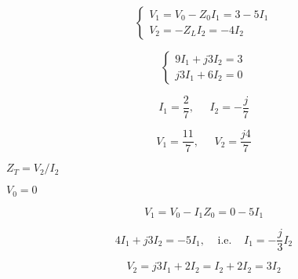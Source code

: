 {\newpage\clearpage
{}%
\begin{displaymath} \left\{ \begin{array}{l} V_1=V_0-Z_0 I_1=3-5I_1 \\
	V_2=-Z_L I_2=-4 I_2 \end{array} \right.	\end{displaymath}%
\lthtmldisplayZ
\lthtmlcheckvsize\clearpage}

{\newpage\clearpage
{}%
\begin{displaymath} \left\{ \begin{array}{l} 9I_1+j3I_2=3 \\j3I_1+6I_2=0 \end{array} \right. \end{displaymath}%
\lthtmldisplayZ
\lthtmlcheckvsize\clearpage}

{\newpage\clearpage
{}%
\begin{displaymath}	I_1=\frac{2}{7},\;\;\;\;\;I_2=-\frac{j}{7} \end{displaymath}%
\lthtmldisplayZ
\lthtmlcheckvsize\clearpage}

{\newpage\clearpage
{}%
\begin{displaymath}	V_1=\frac{11}{7},\;\;\;\;\;V_2=\frac{j4}{7} \end{displaymath}%
\lthtmldisplayZ
\lthtmlcheckvsize\clearpage}

{\newpage\clearpage
{}%
$Z_T=V_2/I_2$%
\lthtmlinlinemathZ
\lthtmlcheckvsize\clearpage}

{\newpage\clearpage
{}%
$V_0=0$%
\lthtmlinlinemathZ
\lthtmlcheckvsize\clearpage}

{\newpage\clearpage
{}%
\begin{displaymath} V_1=V_0-I_1 Z_0=0-5I_1	\end{displaymath}%
\lthtmldisplayZ
\lthtmlcheckvsize\clearpage}

{\newpage\clearpage
{}%
\begin{displaymath} 4I_1+j3I_2=-5I_1,\;\;\;\;\mbox{i.e.}\;\;\;\;I_1=-\frac{j}{3} I_2	\end{displaymath}%
\lthtmldisplayZ
\lthtmlcheckvsize\clearpage}

{\newpage\clearpage
{}%
\begin{displaymath} V_2=j3I_1+2I_2=I_2+2I_2=3I_2 \end{displaymath}%
\lthtmldisplayZ
\lthtmlcheckvsize\clearpage}

